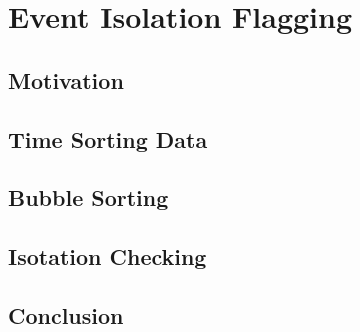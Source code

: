 \section{Event Isolation Flagging}
	
	\subsection{Motivation}

	\subsection{Time Sorting Data}

	\subsection{Bubble Sorting}

	\subsection{Isotation Checking}

	\subsection{Conclusion} 
